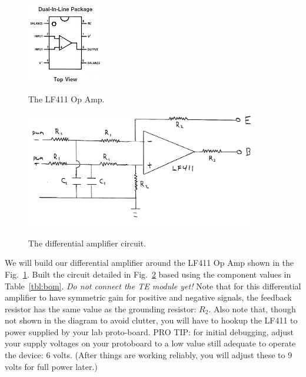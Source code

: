 \documentclass[12pt]{article}
\begin{document}
\begin{figure}[htb]
\begin{center}
{\includegraphics[width=0.30\textwidth]{figs/LF411.jpg}}
\end{center}
\caption{\label{fig:lf411} The LF411 Op Amp.}
\end{figure}

\begin{figure}[htb]
\begin{center}
{\includegraphics[width=0.90\textwidth]{figs/circuit.png}}
\end{center}
\caption{\label{fig:circuit} The differential amplifier circuit.}
\end{figure}


We will build our differential amplifier around the LF411 Op Amp shown in the
Fig.~\ref{fig:lf411}.  Built the circuit detailed in Fig.~\ref{fig:circuit}
based using the component values in Table~\ref{tbl:bom}.  {\em Do not connect
  the TE module yet!} Note that for this differential amplifier to have
symmetric gain for positive and negative signals, the feedback resistor has the
same value as the grounding resistor: $R_2$.  Also note that, though not shown
in the diagram to avoid clutter, you will have to hookup the LF411 to power
supplied by your lab proto-board.  PRO TIP: for initial debugging, adjust your
supply voltages on your protoboard to a low value still adequate to operate the
device: 6 volts.  (After things are working reliably, you will adjust these to 9
volts for full power later.)
\end{document}
